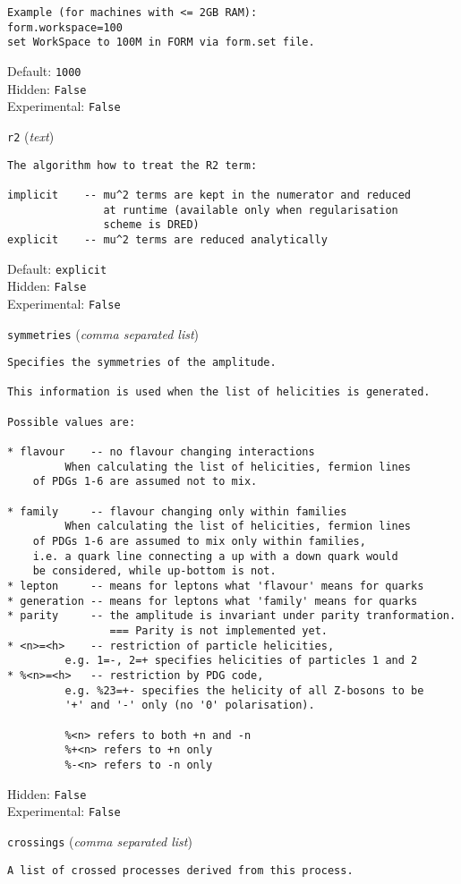 \begin{basedescript}{\desclabelstyle{\pushlabel}}
\begin{verbatim}
Example (for machines with <= 2GB RAM):
form.workspace=100
set WorkSpace to 100M in FORM via form.set file.
\end{verbatim}
Default: \verb|1000|
\\Hidden: \verb|False|
\\Experimental: \verb|False|
\\\item[\colorbox{gray!30}{\texttt{r2}}] (\textit{text})
\begin{verbatim}
The algorithm how to treat the R2 term:

implicit    -- mu^2 terms are kept in the numerator and reduced
               at runtime (available only when regularisation
               scheme is DRED)
explicit    -- mu^2 terms are reduced analytically
\end{verbatim}
Default: \verb|explicit|
\\Hidden: \verb|False|
\\Experimental: \verb|False|
\\\item[\colorbox{gray!30}{\texttt{symmetries}}] (\textit{comma separated list})
\begin{verbatim}
Specifies the symmetries of the amplitude.

This information is used when the list of helicities is generated.

Possible values are:

* flavour    -- no flavour changing interactions
         When calculating the list of helicities, fermion lines
    of PDGs 1-6 are assumed not to mix.

* family     -- flavour changing only within families
         When calculating the list of helicities, fermion lines
    of PDGs 1-6 are assumed to mix only within families,
    i.e. a quark line connecting a up with a down quark would
    be considered, while up-bottom is not.
* lepton     -- means for leptons what 'flavour' means for quarks
* generation -- means for leptons what 'family' means for quarks
* parity     -- the amplitude is invariant under parity tranformation.
                === Parity is not implemented yet.
* <n>=<h>    -- restriction of particle helicities,
         e.g. 1=-, 2=+ specifies helicities of particles 1 and 2
* %<n>=<h>   -- restriction by PDG code,
         e.g. %23=+- specifies the helicity of all Z-bosons to be
         '+' and '-' only (no '0' polarisation).

         %<n> refers to both +n and -n
         %+<n> refers to +n only
         %-<n> refers to -n only
\end{verbatim}
Hidden: \verb|False|
\\Experimental: \verb|False|
\\\item[\colorbox{gray!30}{\texttt{crossings}}] (\textit{comma separated list})
\begin{verbatim}
A list of crossed processes derived from this process.


\end{verbatim}
\end{basedescript}
